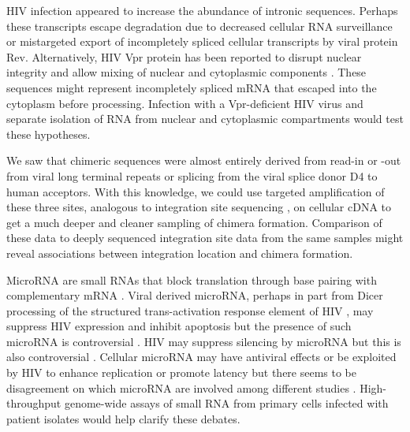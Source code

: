 \documentclass[../sherrill-Mix_thesis.tex]{subfiles}
\begin{document}
	HIV infection appeared to increase the abundance of intronic sequences. Perhaps these transcripts escape degradation due to decreased cellular RNA surveillance or mistargeted export of incompletely spliced cellular transcripts by viral protein Rev.  Alternatively, HIV Vpr protein has been reported to disrupt nuclear integrity and allow mixing of nuclear and cytoplasmic components \citep{Noronha2001}. These sequences might represent incompletely spliced mRNA that escaped into the cytoplasm before processing. Infection with a Vpr-deficient HIV virus and separate isolation of RNA from nuclear and cytoplasmic compartments \citep{Wilkinson1988,Trask2009,Solnestam2012} would test these hypotheses.

	We saw that chimeric sequences were almost entirely derived from read-in or -out from viral long terminal repeats or splicing from the viral splice donor D4 to human acceptors. With this knowledge, we could use targeted amplification of these three sites, analogous to integration site sequencing \citep{Schroder2002,Wang2007,Berry2014}, on cellular cDNA to get a much deeper and cleaner sampling of chimera formation. Comparison of these data to deeply sequenced integration site data from the same samples might reveal associations between integration location and chimera formation.

	MicroRNA are small RNAs that block translation through base pairing with complementary mRNA \citep{Lagos-Quintana2001, Ambros2004,Landgraf2007}.  Viral derived microRNA, perhaps in part from Dicer processing of the structured trans-activation response element of HIV \citep{Klase2007,Ouellet2008,Schopman2012,Klase2009}, may suppress HIV expression \citep{Omoto2004,Triboulet2007,Chable-Bessia2009} and inhibit apoptosis \citep{Klase2009} but the presence of such microRNA is controversial \citep{Pfeffer2005,Lin2007}. HIV may suppress silencing by microRNA \citep{Bennasser2005,Triboulet2007,Qian2009} but this is also controversial \citep{Lin2007}. Cellular microRNA may have antiviral effects \citep{Sung2009,Swaminathan2012} or be exploited by HIV to enhance replication \citep{Zhang2012a,Zhang2012,Chiang2013,Orecchini2014,Farberov2015} or promote latency \citep{Huang2007,Chiang2012} but there seems to be disagreement on which microRNA are involved among different studies \citep{Chiang2012a}. High-throughput genome-wide assays of small RNA \citep{Lefebvre2011,Chang2013} from primary cells infected with patient isolates would help clarify these debates.

	
\end{document}
